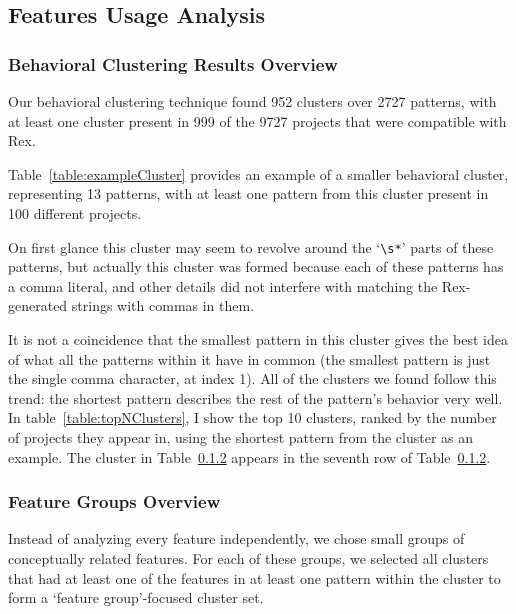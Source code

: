 

\subsection{Features Usage Analysis}
\subsubsection{Behavioral Clustering Results Overview}


Our behavioral clustering technique found 952 clusters over 2727 patterns, with at least one cluster present in 999 of the 9727 projects that were compatible with Rex.


Table~\ref{table:exampleCluster} provides an example of a smaller behavioral cluster, representing 13 patterns, with at least one pattern from this cluster present in 100 different projects.

On first glance this cluster may seem to revolve around the `\verb!\s*!' parts of these patterns, but actually this cluster was formed because each of these patterns has a comma literal, and other details did not interfere with matching the Rex-generated strings with commas in them.

It is not a coincidence that the smallest pattern in this cluster gives the best idea of what all the patterns within it have in common (the smallest pattern is just the single comma character, at index 1).  All of the clusters we found follow this trend: the shortest pattern describes the rest of the pattern's behavior very well.  In table~\ref{table:topNClusters}, I show the top 10 clusters, ranked by the number of projects they appear in, using the shortest pattern from the cluster as an example.
The cluster in Table~\ref{} appears in the seventh row of Table~\ref{}.



\subsubsection{Feature Groups Overview}
Instead of analyzing every feature independently, we chose small groups of conceptually related features.  For each of these groups, we selected all clusters that had at least one of the features in at least one pattern within the cluster to form a `feature group'-focused cluster set.

